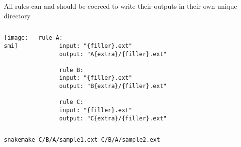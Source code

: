 \documentclass[10pt, usenames, dvipsnames]{beamer}
\def\smi{out/ln/updir/mw-gcthesis-oral/library.bib}
\begin{document}
\begin{frame}[fragile]{All rules can and should be coerced to write their outputs in their own unique directory}
  \centering
  \begin{columns}
      \def\smi{out/graphviz/dot_-Tpdf/ln/updir/mw-gcthesis-oral/dot/ABC.pdf}
      \texttt{[image: \\smi]}%
      \begin{lstlisting}[language=snakemake]
      rule A:
      input: "{filler}.ext"
      output: "A{extra}/{filler}.ext"

      rule B:
      input: "{filler}.ext"
      output: "B{extra}/{filler}.ext"

      rule C:
      input: "{filler}.ext"
      output: "C{extra}/{filler}.ext"\end{lstlisting}
  \end{columns}
  \begin{lstlisting}
snakemake C/B/A/sample1.ext C/B/A/sample2.ext
  \end{lstlisting}
\end{frame}
\end{document}

